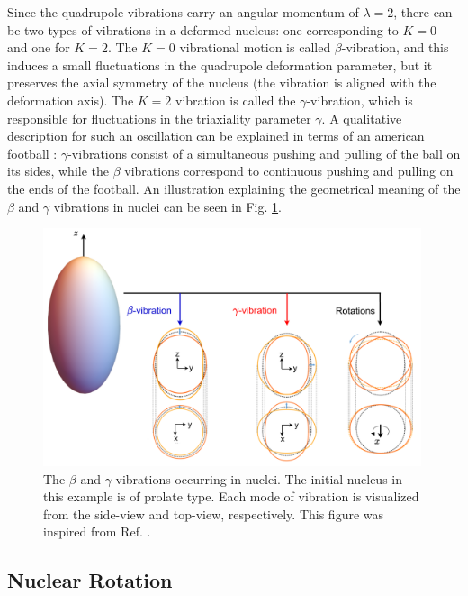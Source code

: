 Since the quadrupole vibrations carry an angular momentum of $\lambda=2$, there can be two types of vibrations in a deformed nucleus: one corresponding to $K=0$ and one for $K=2$. The $K=0$ vibrational motion is called $\beta$-vibration, and this induces a small fluctuations in the quadrupole deformation parameter, but it preserves the axial symmetry of the nucleus (the vibration is aligned with the deformation axis). The $K=2$ vibration is called the $\gamma$-vibration, which is responsible for fluctuations in the triaxiality parameter $\gamma$. A qualitative description for such an oscillation can be explained in terms of an american football \cite{krane1991introductory}: $\gamma$-vibrations consist of a simultaneous pushing and pulling of the ball on its sides, while the $\beta$ vibrations correspond to continuous pushing and pulling on the ends of the football. An illustration explaining the geometrical meaning of the $\beta$ and $\gamma$ vibrations in nuclei can be seen in Fig. \ref{rotation-vibration-geometrics}.
\begin{figure}
    \centering
    \includegraphics[width=0.99\textwidth]{Chapters/Figures/rotationsVibrations_Rotations.pdf}
    \caption{The $\beta$ and $\gamma$ vibrations occurring in nuclei. The initial nucleus in this example is of prolate type. Each mode of vibration is visualized from the side-view and top-view, respectively. This figure was inspired from Ref. \cite{li2022model}.}
    \label{rotation-vibration-geometrics}
\end{figure}

\subsection{Nuclear Rotation}
\label{subsection-nuclear-rotation}


